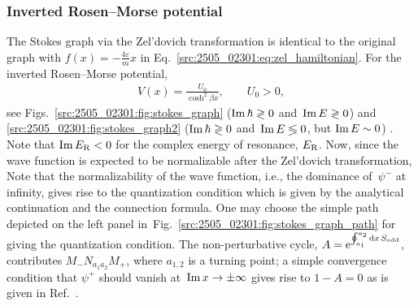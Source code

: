 \subsubsection{Inverted Rosen--Morse potential}
The Stokes graph via the Zel'dovich transformation is identical to the original graph
with $f(x)=-\frac{4\varepsilon}{m}x$ in Eq.~\eqref{src:2505_02301:eq:zel_hamiltonian}.
For the inverted Rosen--Morse potential,
\begin{align}
    V(x) = \frac{U_0}{\cosh^2\beta x},
        \qquad U_0 > 0,
\end{align}
see Figs.~\ref{src:2505_02301:fig:stokes_graph} ($\operatorname{Im}\hbar\gtrless0$ and~$\operatorname{Im} E\gtrless0$) and \ref{src:2505_02301:fig:stokes_graph2} ($\operatorname{Im}\hbar\gtrless0$ and~$\operatorname{Im} E\lessgtr0$, but $\operatorname{Im} E\sim0$) \cite{Morikawa:2025grx}.
Note that $\operatorname{Im} E_{\mathrm{R}}<0$ for the complex energy of resonance, $E_{\mathrm{R}}$.
Now, since the wave function is expected to be normalizable after the Zel'dovich transformation,
Note that the normalizability of the wave function,
i.e., the dominance of~$\psi^{-}$ at infinity,
gives rise to the quantization condition which is given by the analytical continuation and the connection formula.
One may choose the simple path depicted on the left panel in~Fig.~\ref{src:2505_02301:fig:stokes_graph_path}
for giving the quantization condition.
The non-perturbative cycle, $A=\mathrm{e}^{\oint_{a_1}^{a_2}\mathrm{d} x\,S_{\text{odd}}}$, contributes $M_{-}N_{a_1a_2}M_{+}$, where $a_{1,2}$ is a turning point; a simple convergence condition that $\psi^{+}$ should vanish at~$\operatorname{Im} x\to\pm\infty$ gives rise to $1-A=0$ as is given in Ref.~\cite{Morikawa:2025grx}.
